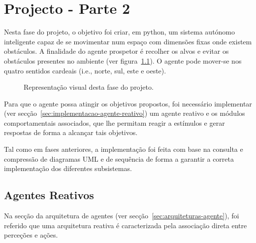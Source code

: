 \chapter{Projecto - Parte 2}\label{ch:projeto-parte2}

Nesta fase do projeto, o objetivo foi criar, em python, um sistema autónomo inteligente capaz de se movimentar num espaço com dimensões fixas onde existem obstáculos.
A finalidade do agente prospetor é recolher os alvos e evitar os obstáculos presentes no ambiente (ver figura~\ref{fig:agente-prospetor}). O agente pode mover-se nos quatro sentidos cardeais (i.e., norte, sul, este e oeste).

\begin{figure}[H]
    \begin{center}
    \end{center}
    \caption{Representação visual desta fase do projeto.}\label{fig:agente-prospetor}
\end{figure}

Para que o agente possa atingir os objetivos propostos, foi necessário implementar (ver secção~\ref{sec:implementacao-agente-reativo}) um agente reativo e os módulos comportamentais associados, que lhe permitam reagir a estímulos e gerar respostas de forma a alcançar tais objetivos.

Tal como em fases anteriores, a implementação foi feita com base na consulta e compressão de diagramas UML e de sequência de forma a garantir a correta implementação dos diferentes subsistemas.


\section{Agentes Reativos}\label{sec:agentes-reativos}

Na secção da arquitetura de agentes (ver secção~\ref{sec:arquiteturas-agente}), foi referido que uma arquitetura reativa é caracterizada pela associação direta entre perceções e ações.

